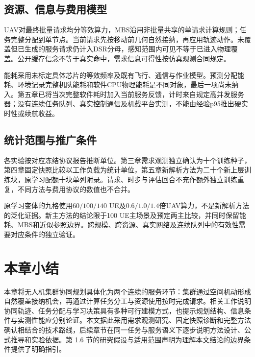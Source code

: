 \subsection{资源、信息与费用模型}
\label{sec:energy-assumptions}
\label{sec:timing-assumptions}
\label{sec:protocol-assumptions}
UAV对最终批量请求均分等效算力，MBS沿用非批量共享的单请求计算规则；任务完整分配到单节点。当前请求先按移动前几何自然接纳，再应用轨迹动作。未覆盖但已生成的服务请求仍计入DSR分母，感知范围内可见不等于已进入物理覆盖。公开缓存信念不等于真实命中，需求信息可得性按仿真观测合同规定。

能耗采用未标定具体芯片的等效频率及既有飞行、通信与作业模型。预测分配能耗、环境记录完整机队能耗和软件CPU物理能耗是不同对象，最后一项尚未纳入。第五章已将当次完整软件耗时加入当前服务反馈，计时来自规定高并发服务器；没有连续任务队列、真实控制通信及机载平台实测，不能由经验p95推出硬实时性或续航收益。

\subsection{统计范围与推广条件}
\label{sec:statistical-assumptions}
\label{sec:overall-scope}
各实验按对应冻结协议报告推断单位。第三章需求观测独立确认为十个训练种子，第四章固定快照比较以工作负载为统计单位，第五章新解析方法为二十个新上层训练块，原学习配额十块单列附录。请求、时步与评估回合不充作额外独立训练重复，不同方法与费用协议的数值也不合并。

原学习变体的九格使用$60/100/140$ UE及$0.6/1.0/1.4$倍UAV算力，不是新解析方法的泛化证据。新主方法的结论限于100 UE主场景及预定两主比较，并同时保留能耗、MBS和近似参照边界。跨规模、跨资源、真实网络及连续队列中的有效性需要对应条件的独立验证。

\section{本章小结}
\label{sec:summary-chap01}

本章将无人机集群协同规划具体化为两个连续的服务环节：集群通过空间机动形成自然覆盖接纳机会，再通过计算任务分工与资源使用按时完成请求。相关工作说明协同轨迹、任务分配与学习决策具有多种可行建模方式，也提示规划结构、信息条件与实测性能应分别论证。本文据此采用需求观测研究、固定快照诊断和完整方法确认相结合的技术路线，后续章节在同一任务与服务语义下逐步说明方法设计、公式推导和实验依据。第 1.6 节的研究假设与适用范围声明为理解本文结论的边界条件提供了明确指引。
